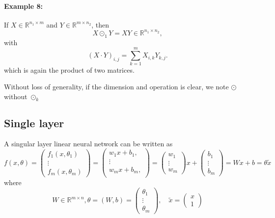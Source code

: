 \paragraph{Example 8: } If $X \in \mathbb{R}^{n_1 \times m}$ and $Y \in \mathbb{R}^{m \times n_2}$, then
\begin{equation}\label{3DColorImage}
X \odot_1 Y =XY\in \mathbb{R}^{n_1 \times n_2},
\end{equation}
with
\begin{equation}
(X \cdot Y)_{i,j} = \sum_{k=1}^m X_{i,k} Y_{k,j}.
\end{equation}
which is again the product of two matrices.

\begin{remark}
Without loss of generality, if the dimension and operation is clear, we note $\odot$ without $\odot_k$
\end{remark}

\newpage
\subsection{Single layer}
A singular layer linear neural network can be written as
$$
f(x, \theta)
=
\begin{pmatrix}
  f_1(x,\theta_1)\\
\vdots
\\
  f_m(x,\theta_m)
\end{pmatrix}
=
\begin{pmatrix}
 w_1 x+b_1, \\
\vdots
\\
 w_m x+b_m, \\
\end{pmatrix}
=
\begin{pmatrix}
 w_1\\
\vdots
\\
 w_m
\end{pmatrix}x
+
\begin{pmatrix}
b_1\\
\vdots
\\
b_m
\end{pmatrix}
=Wx+b=\theta \tilde x
$$
where
\begin{equation}
W\in \mathbb R^{m\times n},
\theta=(W,b)=
\begin{pmatrix}
  \theta_1\\
\vdots\\
\theta_m
\end{pmatrix}, \quad
\tilde x=
\begin{pmatrix}
  x\\
1
\end{pmatrix}
\end{equation}


